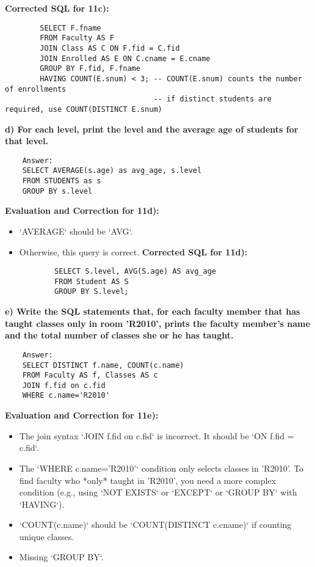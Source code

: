 \documentclass{article}
\begin{document}
\begin{enumerate}[label=\textbf{Question \arabic*.}]
\begin{itemize}
        \textbf{Corrected SQL for 11c):}
        \begin{lstlisting}
        SELECT F.fname
        FROM Faculty AS F
        JOIN Class AS C ON F.fid = C.fid
        JOIN Enrolled AS E ON C.cname = E.cname
        GROUP BY F.fid, F.fname
        HAVING COUNT(E.snum) < 3; -- COUNT(E.snum) counts the number of enrollments
                                  -- if distinct students are required, use COUNT(DISTINCT E.snum)
        \end{lstlisting}
    \end{itemize}

    \textbf{d) For each level, print the level and the average age of students for that level.}
    \begin{lstlisting}
    Answer:
    SELECT AVERAGE(s.age) as avg_age, s.level
    FROM STUDENTS as s
    GROUP BY s.level
    \end{lstlisting}
    \textbf{Evaluation and Correction for 11d):}
    \begin{itemize}
        \item `AVERAGE` should be `AVG`.
        \item Otherwise, this query is correct.
        \textbf{Corrected SQL for 11d):}
        \begin{lstlisting}
        SELECT S.level, AVG(S.age) AS avg_age
        FROM Student AS S
        GROUP BY S.level;
        \end{lstlisting}
    \end{itemize}

    \textbf{e) Write the SQL statements that, for each faculty member that has taught classes only in room 'R2010', prints the faculty member’s name and the total number of classes she or he has taught.}
    \begin{lstlisting}
    Answer:
    SELECT DISTINCT f.name, COUNT(c.name)
    FROM Faculty AS f, Classes AS c
    JOIN f.fid on c.fid
    WHERE c.name='R2010'
    \end{lstlisting}
    \textbf{Evaluation and Correction for 11e):}
    \begin{itemize}
        \item The join syntax `JOIN f.fid on c.fid` is incorrect. It should be `ON f.fid = c.fid`.
        \item The `WHERE c.name='R2010'` condition only selects classes in 'R2010'. To find faculty who *only* taught in 'R2010', you need a more complex condition (e.g., using `NOT EXISTS` or `EXCEPT` or `GROUP BY` with `HAVING`).
        \item `COUNT(c.name)` should be `COUNT(DISTINCT c.cname)` if counting unique classes.
        \item Missing `GROUP BY`.


\end{itemize}
\end{enumerate}
\end{document}
